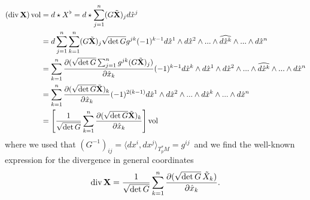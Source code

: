 \documentclass[../master_thesis.tex]{subfiles}
\begin{document}
\begin{align*}
    (\operatorname{div} \mathbf{X}) \operatorname{vol} 
    &= d \star X^\flat 
    = d \star \sum_{j=1}^n (G \tilde{\mathbf{X}})_j d\hat{x}^j 
    \\ &= d \sum_{j=1}^n \sum_{k=1}^n (G \tilde{\mathbf{X}})_j 
        \sqrt{ \det G} g^{jk} (-1)^{k-1} d\hat{x}^1 \wedge d\hat{x}^2 \wedge ... \wedge 
        \widehat{d\hat{x}^k} \wedge ... \wedge d\hat{x}^n 
    \\ &= \sum_{k=1}^n \frac{\partial
        (\sqrt{ \det G} \sum_{j=1}^n g^{jk} (G \tilde{\mathbf{X}})_j )}
        {\partial \hat{x}_k} (-1)^{k-1} d\hat{x}^k \wedge d\hat{x}^1 \wedge d\hat{x}^2 \wedge ... \wedge 
        \widehat{d\hat{x}^k} \wedge ... \wedge d\hat{x}^n 
    \\ &= \sum_{k=1}^n \frac{\partial (\sqrt{ \det G}  \tilde{\mathbf{X}})_k }
        {\partial \hat{x}_k} (-1)^{2(k-1)} d\hat{x}^1 \wedge d\hat{x}^2 \wedge ... \wedge 
        d\hat{x}^k \wedge ... \wedge d\hat{x}^n
    \\ &= \left[ \frac{1}{\sqrt{ \det G}} \sum_{k=1}^n 
        \frac{\partial (\sqrt{ \det G}  \tilde{\mathbf{X}})_k }{\partial \hat{x}_k}
        \right] \operatorname{vol}
\end{align*}
where we used that $(G^{-1})_{ij} = \langle dx^i, dx^j \rangle_{T^*_p M} = g^{ij}$\
and we find the well-known expression for the divergence in general coordinates
\begin{align*}
    \operatorname{div} \mathbf{X} = \frac{1}{\sqrt{ \det G}} \sum_{k=1}^n 
        \frac{\partial (\sqrt{ \det G} \, \tilde{X}_k )}{\partial \hat{x}_k}.
\end{align*}
\end{document}
